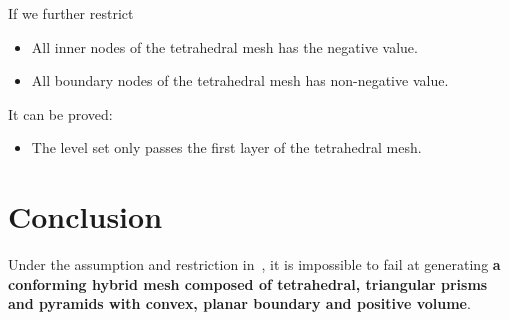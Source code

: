 \documentclass[9pt]{extarticle}
\begin{document}
If we further restrict
\begin{itemize}
  \item All inner nodes of the tetrahedral mesh has the negative value.
  \item All boundary nodes of the tetrahedral mesh has non-negative
        value.
\end{itemize}
It can be proved:
\begin{itemize}
  \item The level set only passes the first layer of the tetrahedral mesh.
\end{itemize}

\section{Conclusion}

Under the assumption and restriction in~, it is
impossible to fail at generating \textbf{a conforming hybrid mesh
  composed of tetrahedral, triangular prisms and pyramids with convex,
  planar boundary and positive volume}.
\end{document}
